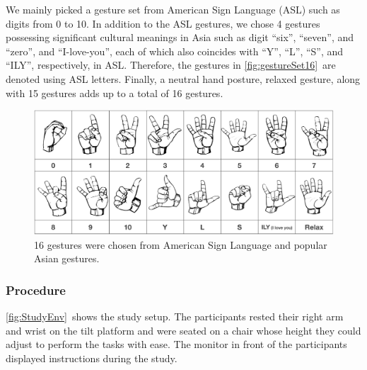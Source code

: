 \documentclass{sigchi}
\begin{document}

We mainly picked a gesture set from American Sign Language (ASL) such as digits from 0 to 10. In addition to the ASL gestures, we chose 4 gestures possessing significant cultural meanings in Asia such as digit ``six'', ``seven'', and ``zero'', and ``I-love-you'', each of which also coincides with ``Y'', ``L'', ``S'', and ``ILY'', respectively, in ASL. Therefore, the gestures in \autoref{fig:gestureSet16}\ are denoted using ASL letters. Finally, a neutral hand posture, relaxed gesture, along with 15 gestures adds up to a total of 16 gestures.

\begin{figure}
  \begin{center}
  \includegraphics[width=1\columnwidth]{figures/gestureSet_16_v3.pdf}
  \caption{16 gestures were chosen from American Sign Language and popular Asian gestures.}
  \label{fig:gestureSet16}
  \end{center}
\end{figure}

\subsubsection{Procedure}
\autoref{fig:StudyEnv}\ shows the study setup. The participants rested their right arm and wrist on the tilt platform and were seated on a chair whose height they could adjust to perform the tasks with ease. The monitor in front of the participants displayed instructions during the study.
\end{document}
